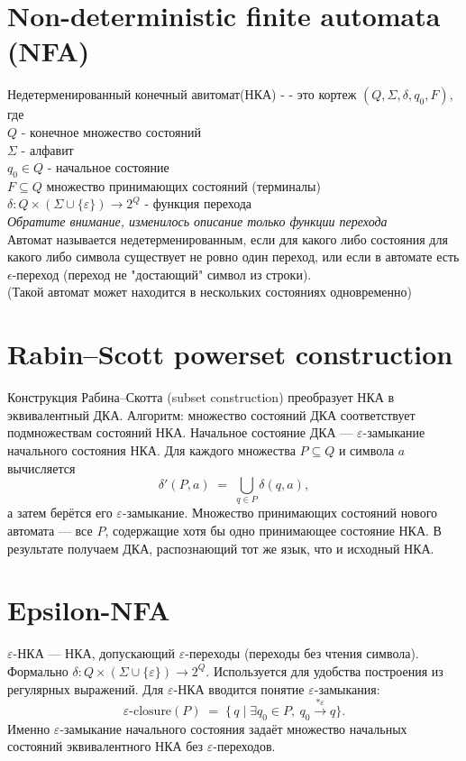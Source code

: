 \documentclass{article}
\begin{document}
	\section{Non-deterministic finite automata (NFA)}
	Недетерменированный конечный авитомат(НКА) -  - это кортеж $(Q, \Sigma, \delta, q_0, F)$, где\\
	$Q$ - конечное множество состояний\\
	$\Sigma$ - алфавит\\
	$q_0\in Q$ - начальное состояние\\
	$F\subseteq Q$ множество принимающих состояний (терминалы)\\
	$\delta\colon Q\times(\Sigma\cup\{\varepsilon\})\to 2^Q$ - функция перехода\\
	\textit{Обратите внимание, изменилось описание только функции перехода}
	\noindent\\
	
	Автомат называется недетерменированным, если для какого либо состояния для какого либо символа существует не ровно один переход, или если в автомате есть $\epsilon$-переход (переход не "достающий" символ из строки).\\
	(Такой автомат может находится в нескольких состояниях одновременно)
		
	\section{Rabin--Scott powerset construction}
	Конструкция Рабина--Скотта (subset construction) преобразует НКА в эквивалентный ДКА. Алгоритм: множество состояний ДКА соответствует подмножествам состояний НКА. Начальное состояние ДКА --- $\varepsilon$-замыкание начального состояния НКА. Для каждого множества $P\subseteq Q$ и символа $a$ вычисляется 
	\[
	\delta'(P,a) \;=\; \bigcup_{q\in P}\delta(q,a),
	\]
	а затем берётся его $\varepsilon$-замыкание. Множество принимающих состояний нового автомата --- все $P$, содержащие хотя бы одно принимающее состояние НКА. В результате получаем ДКА, распознающий тот же язык, что и исходный НКА.
	
	\section{Epsilon-NFA}
	$\varepsilon$-НКА --- НКА, допускающий $\varepsilon$-переходы (переходы без чтения символа). Формально $\delta\colon Q\times(\Sigma\cup\{\varepsilon\})\to 2^Q$. Используется для удобства построения из регулярных выражений. Для $\varepsilon$-НКА вводится понятие $\varepsilon$-замыкания: 
	\[
	\varepsilon\text{-closure}(P) \;=\; \{\, q \mid \exists q_0\in P,\ q_0\stackrel{*\varepsilon}{\longrightarrow}q\}.
	\]
	Именно $\varepsilon$-замыкание начального состояния задаёт множество начальных состояний эквивалентного НКА без $\varepsilon$-переходов.
	
\end{document}

